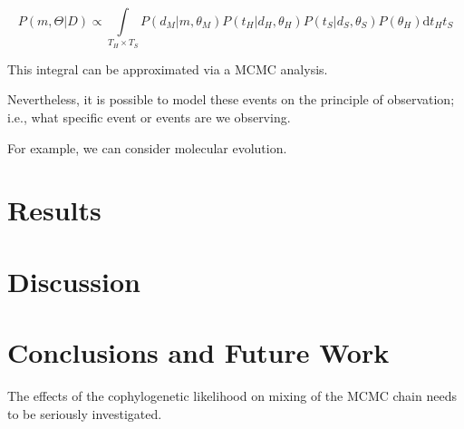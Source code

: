 \documentclass[12pt,letterpaper]{article}
\begin{document}
\begin{equation}
P\left(m,\Theta|D\right) \propto \int\limits_{T_H \times T_S}  P\left(d_M|m, \theta_M\right) P\left(t_H|d_H,\theta_H\right) P\left(t_S|d_S,\theta_S\right) P\left(\theta_H\right) \textrm{d} t_H t_S 
\end{equation}

This integral can be approximated via a \ac{MCMC} analysis.

Nevertheless, it is possible to model these events on the principle of observation; i.e., what specific event or events are we observing.

For example, we can consider molecular evolution.

\section*{Results}

\section*{Discussion}

\section*{Conclusions and Future Work}

The effects of the cophylogenetic likelihood on mixing of the MCMC chain needs to be seriously investigated.

\printbibliography
\end{document}
